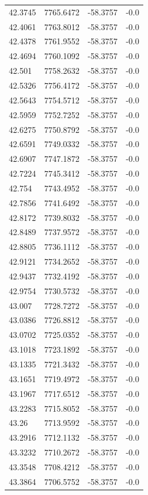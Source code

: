 \begin{table}[H]
\begin{tabular}{llll}
42.3745 & 7765.6472 & -58.3757 & -0.0 \\
42.4061 & 7763.8012 & -58.3757 & -0.0 \\
42.4378 & 7761.9552 & -58.3757 & -0.0 \\
42.4694 & 7760.1092 & -58.3757 & -0.0 \\
42.501 & 7758.2632 & -58.3757 & -0.0 \\
42.5326 & 7756.4172 & -58.3757 & -0.0 \\
42.5643 & 7754.5712 & -58.3757 & -0.0 \\
42.5959 & 7752.7252 & -58.3757 & -0.0 \\
42.6275 & 7750.8792 & -58.3757 & -0.0 \\
42.6591 & 7749.0332 & -58.3757 & -0.0 \\
42.6907 & 7747.1872 & -58.3757 & -0.0 \\
42.7224 & 7745.3412 & -58.3757 & -0.0 \\
42.754 & 7743.4952 & -58.3757 & -0.0 \\
42.7856 & 7741.6492 & -58.3757 & -0.0 \\
42.8172 & 7739.8032 & -58.3757 & -0.0 \\
42.8489 & 7737.9572 & -58.3757 & -0.0 \\
42.8805 & 7736.1112 & -58.3757 & -0.0 \\
42.9121 & 7734.2652 & -58.3757 & -0.0 \\
42.9437 & 7732.4192 & -58.3757 & -0.0 \\
42.9754 & 7730.5732 & -58.3757 & -0.0 \\
43.007 & 7728.7272 & -58.3757 & -0.0 \\
43.0386 & 7726.8812 & -58.3757 & -0.0 \\
43.0702 & 7725.0352 & -58.3757 & -0.0 \\
43.1018 & 7723.1892 & -58.3757 & -0.0 \\
43.1335 & 7721.3432 & -58.3757 & -0.0 \\
43.1651 & 7719.4972 & -58.3757 & -0.0 \\
43.1967 & 7717.6512 & -58.3757 & -0.0 \\
43.2283 & 7715.8052 & -58.3757 & -0.0 \\
43.26 & 7713.9592 & -58.3757 & -0.0 \\
43.2916 & 7712.1132 & -58.3757 & -0.0 \\
43.3232 & 7710.2672 & -58.3757 & -0.0 \\
43.3548 & 7708.4212 & -58.3757 & -0.0 \\
43.3864 & 7706.5752 & -58.3757 & -0.0 \\

\end{tabular}
\end{table}
